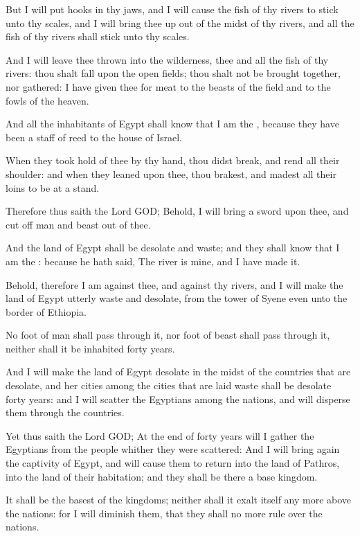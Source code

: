 \verse But I will put hooks in thy jaws, and I will cause the fish of thy rivers to stick unto thy scales, and I will bring thee up out of the midst of thy rivers, and all the fish of thy rivers shall stick unto thy scales.

\verse And I will leave thee thrown into the wilderness, thee and all the fish of thy rivers: thou shalt fall upon the open fields; thou shalt not be brought together, nor gathered: I have given thee for meat to the beasts of the field and to the fowls of the heaven.

\verse And all the inhabitants of Egypt shall know that I am the \LORD, because they have been a staff of reed to the house of Israel.

\verse When they took hold of thee by thy hand, thou didst break, and rend all their shoulder: and when they leaned upon thee, thou brakest, and madest all their loins to be at a stand.

\verse Therefore thus saith the Lord GOD; Behold, I will bring a sword upon thee, and cut off man and beast out of thee.

\verse And the land of Egypt shall be desolate and waste; and they shall know that I am the \LORD: because he hath said, The river is mine, and I have made it.

\verse Behold, therefore I am against thee, and against thy rivers, and I will make the land of Egypt utterly waste and desolate, from the tower of Syene even unto the border of Ethiopia.

\verse No foot of man shall pass through it, nor foot of beast shall pass through it, neither shall it be inhabited forty years.

\verse And I will make the land of Egypt desolate in the midst of the countries that are desolate, and her cities among the cities that are laid waste shall be desolate forty years: and I will scatter the Egyptians among the nations, and will disperse them through the countries.

\verse Yet thus saith the Lord GOD; At the end of forty years will I gather the Egyptians from the people whither they were scattered: \verse And I will bring again the captivity of Egypt, and will cause them to return into the land of Pathros, into the land of their habitation; and they shall be there a base kingdom.

\verse It shall be the basest of the kingdoms; neither shall it exalt itself any more above the nations: for I will diminish them, that they shall no more rule over the nations.


